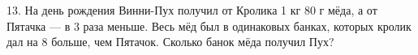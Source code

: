 13. На день рождения Винни-Пух получил от Кролика 1 кг 80 г мёда, а от Пятачка --- в 3 раза меньше. Весь мёд был в одинаковых банках, которых кролик дал на 8 больше, чем Пятачок. Сколько банок мёда получил Пух?\\
